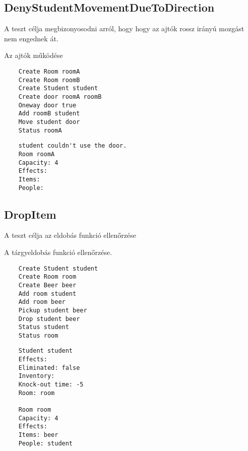 \subsection{DenyStudentMovementDueToDirection}
\begin{test-case-description}
    A teszt célja megbizonyosodni arról, hogy hogy az ajtók rossz irányú mozgást nem
engednek át.
\end{test-case-description}
\begin{test-case-function}
    Az ajtók működése
\end{test-case-function}
\begin{test-case-input}
    \begin{verbatim}
    Create Room roomA
    Create Room roomB
    Create Student student
    Create door roomA roomB
    Oneway door true
    Add roomB student
    Move student door
    Status roomA
    \end{verbatim}
\end{test-case-input}
\begin{test-case-output}
    \begin{verbatim}
    student couldn't use the door.
    Room roomA
    Capacity: 4
    Effects:
    Items: 
    People:
    \end{verbatim}
\end{test-case-output}

\subsection{DropItem}
\begin{test-case-description}
    A teszt célja az eldobás funkció ellenőrzése
\end{test-case-description}
\begin{test-case-function}
    A tárgyeldobás funkció ellenőrzése.
\end{test-case-function}
\begin{test-case-input}
    \begin{verbatim}
    Create Student student
    Create Room room
    Create Beer beer
    Add room student
    Add room beer
    Pickup student beer
    Drop student beer
    Status student
    Status room
    \end{verbatim}
\end{test-case-input}
\begin{test-case-output}
    \begin{verbatim}
    Student student
    Effects:
    Eliminated: false
    Inventory: 
    Knock-out time: -5
    Room: room

    Room room
    Capacity: 4
    Effects:
    Items: beer
    People: student
    \end{verbatim}
\end{test-case-output}

